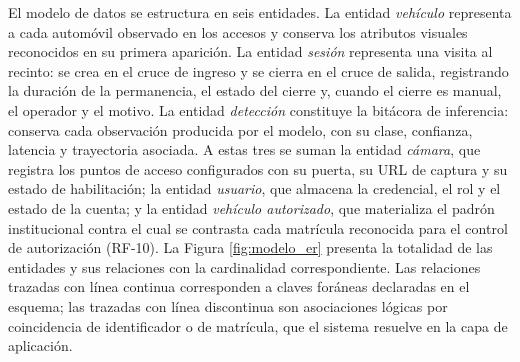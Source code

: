El modelo de datos se estructura en seis entidades. La entidad
\textit{vehículo} representa a cada automóvil observado en los accesos y
conserva los atributos visuales reconocidos en su primera aparición. La entidad
\textit{sesión} representa una visita al recinto: se crea en el cruce de ingreso
y se cierra en el cruce de salida, registrando la duración de la permanencia, el
estado del cierre y, cuando el cierre es manual, el operador y el motivo. La
entidad \textit{detección} constituye la bitácora de inferencia: conserva cada
observación producida por el modelo, con su clase, confianza, latencia y
trayectoria asociada. A estas tres se suman la entidad \textit{cámara}, que
registra los puntos de acceso configurados con su puerta, su URL de captura y su
estado de habilitación; la entidad \textit{usuario}, que almacena la credencial,
el rol y el estado de la cuenta; y la entidad \textit{vehículo autorizado}, que
materializa el padrón institucional contra el cual se contrasta cada matrícula
reconocida para el control de autorización (RF-10). La Figura
\ref{fig:modelo_er} presenta la totalidad de las entidades y sus relaciones con
la cardinalidad correspondiente. Las relaciones trazadas con línea continua
corresponden a claves foráneas declaradas en el esquema; las trazadas con línea
discontinua son asociaciones lógicas por coincidencia de identificador o de
matrícula, que el sistema resuelve en la capa de aplicación.

